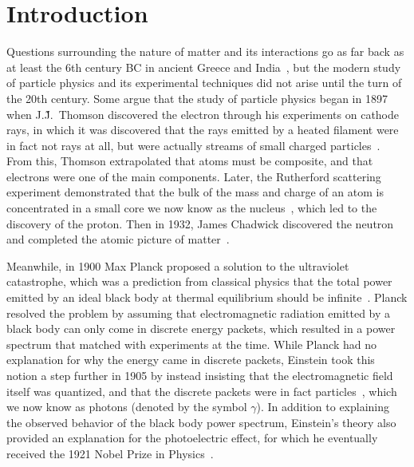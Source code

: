 
\chapter{Introduction}
\label{chap:intro}

Questions surrounding the nature of matter and its interactions go as far back as at least the 6th century BC in ancient Greece and India~\cite{PhysNuclphys196p}, but the modern study of particle physics and its experimental techniques did not arise until the turn of the 20th century. %
Some argue that the study of particle physics began in 1897 when J.\~J.\ Thomson discovered the electron through his experiments on cathode rays, in which it was discovered that the rays emitted by a heated filament were in fact not rays at all, but were actually streams of small charged particles~\cite{doi:10.1080/14786449708621070}.
From this, Thomson extrapolated that atoms must be composite, and that electrons were one of the main components.
Later, the Rutherford scattering experiment demonstrated that the bulk of the mass and charge of an atom is concentrated in a small core we now know as the nucleus~\cite{BargerCollider}, which led to the discovery of the proton.
Then in 1932, James Chadwick discovered the neutron and completed the atomic picture of matter~\cite{weinberg2003discovery}.

Meanwhile, in 1900 Max Planck proposed a solution to the ultraviolet catastrophe, which was a prediction from classical physics that the total power emitted by an ideal black body at thermal equilibrium should be infinite~\cite{schroeder2013introduction}.
Planck resolved the problem by assuming that electromagnetic radiation emitted by a black body can only come in discrete energy packets, which resulted in a power spectrum that matched with experiments at the time.
While Planck had no explanation for why the energy came in discrete packets, Einstein took this notion a step further in 1905 by instead insisting that the electromagnetic field itself was quantized, and that the discrete packets were in fact particles~\cite{doi:10.1002/andp.19053220607}, which we now know as photons (denoted by the symbol $\gamma$).
In addition to explaining the observed behavior of the black body power spectrum, Einstein's theory also provided an explanation for the photoelectric effect, for which he eventually received the 1921 Nobel Prize in Physics~\cite{NobelPrize:1921-Physics}.

